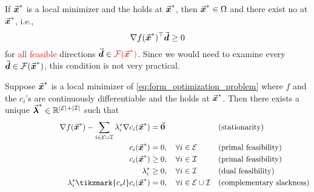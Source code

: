 \begin{lemma}\label{lem:fundamental_condition}
  If \(\vec{\boldsymbol{x}}^{\ast}\) is a local minimizer and the  holds at \(\vec{\boldsymbol{x}}^{\ast}\), then \(\vec{\boldsymbol{x}}^{\ast} \in \Omega\) and there exist no  at $\vec{\boldsymbol{x}}^*$, i.e.,
  \[
    \nabla f(\vec{\boldsymbol{x}}^{\ast})^{\top} \vec{\boldsymbol{d}} \ge 0
  \]
  for \textcolor{red}{all feasible} directions \(\vec{\boldsymbol{d}}\in\textcolor{red}{\mathcal{F}(\vec{\boldsymbol{x}}^{\ast})}\).
  Since we would need to examine every \(\vec{\boldsymbol{d}}\in\mathcal{F}(\vec{\boldsymbol{x}}^{\ast})\), this condition is not very practical.
\end{lemma}

\begin{theorem}\label{thm:KKT}
Suppose \(\vec{\boldsymbol{x}}^{\ast}\) is a local minimizer of \eqref{eq:form_optimization_problem} where \(f\) and the \(c_i\)'s are continuously differentiable and the  holds at \(\vec{\boldsymbol{x}}^{\ast}\). 
Then there exists a unique \(\vec{\boldsymbol{\lambda}}^{\ast}\in\mathbb{R}^{|\mathcal{E}|+|\mathcal{I}|}\) such that
\begin{subequations}\label{eq:KKT}
  \begin{align}
    &\qquad\qquad\qquad&\nabla f(\vect{x}^{\ast}) - \sum_{i\in\mathcal{E}\cup\mathcal{I}} \lambda_{i}^{\ast} \nabla c_{i}(\vect{x}^{\ast}) &= \vect{0}   &&\text{(stationarity)} \label{eq:KKT_stationarity} \\ %
    &\qquad\qquad\qquad&c_{i}(\vect{x}^{\ast}) &= 0,                                            \quad \forall i\in\mathcal{E}                             &&\text{(primal feasibility)}                \label{eq:KKT_equal_feas} \\
    &\qquad\qquad\qquad&c_{i}(\vect{x}^{\ast}) &\ge 0,                                          \quad \forall i\in\mathcal{I}                             &&\text{(primal feasibility)}                \label{eq:KKT_inequal_feas} \\
    &\qquad\qquad\qquad&\lambda_{i}^{\ast} &\ge 0,                                              \quad \forall i\in\mathcal{I}                             &&\text{(dual feasibility)}                  \label{eq:KKT_dual_feas} \\
    &\qquad\qquad\qquad&\lambda_{i}^{\ast} \tikzmark{c_sl}c_{i}(\vect{x}^{\ast}) &= 0,   \quad \forall i\in\mathcal{E}\cup\mathcal{I}              &&\text{(complementary slackness)}           \label{eq:KKT_comp_slack} %

\end{align}
\end{subequations}
\end{theorem}
